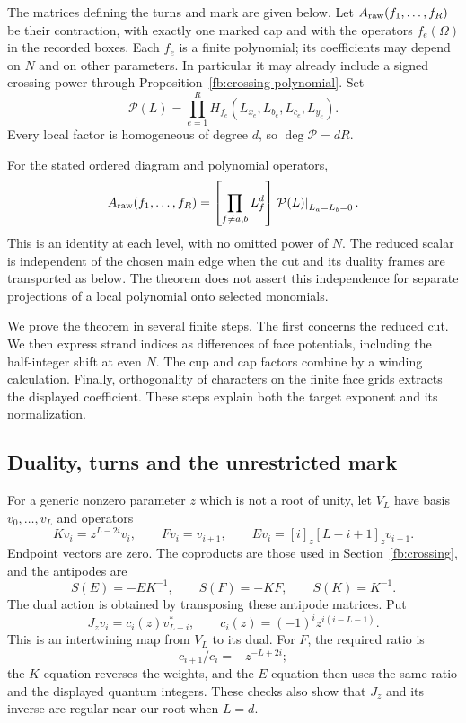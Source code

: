 The matrices defining the turns and mark are given below. Let
\(A_{\rm raw}(f_1,\ldots,f_R)\) be their contraction, with exactly
one marked cap and with the operators \(f_e(\Omega)\) in the
recorded boxes. Each \(f_e\) is a finite polynomial; its coefficients
may depend on \(N\) and on other parameters. In particular it may
already include a signed crossing power through
Proposition~\ref{fb:crossing-polynomial}. Set
\[
 \mathcal P(L)=\prod_{e=1}^R
 H_{f_e}(L_{x_e},L_{b_e},L_{c_e},L_{y_e}).
\]
Every local factor is homogeneous of degree \(d\), so
\(\deg\mathcal P=dR\).

\begin{theorem}
\label{de:coefficient-theorem}
For the stated ordered diagram and polynomial operators,
\begin{equation}\label{de:coefficient}
 A_{\rm raw}(f_1,\ldots,f_R)
 =\left[\prod_{f\ne a,b}L_f^d\right]
       \left.\mathcal P(L)\right|_{L_a=L_b=0}.
\end{equation}
This is an identity at each level, with no omitted power of \(N\).
The reduced scalar is independent of the chosen main edge when the
cut and its duality frames are transported as below. The theorem
does not assert this independence for separate projections of a
local polynomial onto selected monomials.
\end{theorem}

We prove the theorem in several finite steps. The first concerns
the reduced cut. We then express strand indices as differences of
face potentials, including the half-integer shift at even $N$.
The cup and cap factors combine by a winding calculation. Finally,
orthogonality of characters on the finite face grids extracts the
displayed coefficient. These steps explain both the target exponent
and its normalization.

\subsection{Duality, turns and the unrestricted mark}

For a generic nonzero parameter \(z\) which is not a root of unity,
let \(V_L\) have basis \(v_0,\ldots,v_L\) and operators
\[
 Kv_i=z^{L-2i}v_i,\qquad
 Fv_i=v_{i+1},\qquad
 Ev_i=[i]_z[L-i+1]_zv_{i-1}.
\]
Endpoint vectors are zero. The coproducts are those used in
Section~\ref{fb:crossing}, and the antipodes are
\[
 S(E)=-EK^{-1},\qquad S(F)=-KF,\qquad S(K)=K^{-1}.
\]
The dual action is obtained by transposing these antipode matrices.
Put
\begin{equation}\label{de:J}
 J_zv_i=c_i(z)v_{L-i}^*,\qquad
 c_i(z)=(-1)^iz^{i(i-L-1)}.
\end{equation}
This is an intertwining map from \(V_L\) to its dual. For \(F\),
the required ratio is
\[
 c_{i+1}/c_i=-z^{-L+2i};
\]
the \(K\) equation reverses the weights, and the \(E\) equation then
uses the same ratio and the displayed quantum integers. These
checks also show that \(J_z\) and its inverse are regular near our
root when \(L=d\).

